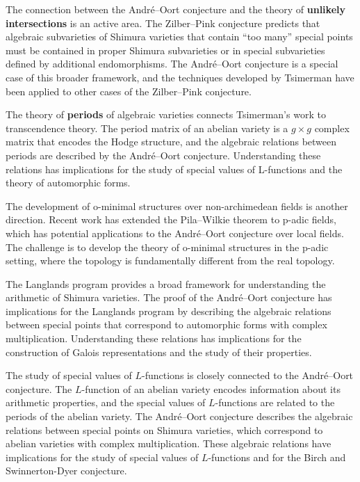 The connection between the Andr\'{e}--Oort conjecture and the theory of \textbf{unlikely intersections} is an active area. The Zilber--Pink conjecture predicts that algebraic subvarieties of Shimura varieties that contain ``too many'' special points must be contained in proper Shimura subvarieties or in special subvarieties defined by additional endomorphisms. The Andr\'{e}--Oort conjecture is a special case of this broader framework, and the techniques developed by Tsimerman have been applied to other cases of the Zilber--Pink conjecture.

The theory of \textbf{periods} of algebraic varieties connects Tsimerman's work to transcendence theory. The period matrix of an abelian variety is a $g \times g$ complex matrix that encodes the Hodge structure, and the algebraic relations between periods are described by the Andr\'{e}--Oort conjecture. Understanding these relations has implications for the study of special values of L-functions and the theory of automorphic forms.

The development of o-minimal structures over non-archimedean fields is another direction. Recent work has extended the Pila--Wilkie theorem to p-adic fields, which has potential applications to the Andr\'{e}--Oort conjecture over local fields. The challenge is to develop the theory of o-minimal structures in the p-adic setting, where the topology is fundamentally different from the real topology.

The Langlands program provides a broad framework for understanding the arithmetic of Shimura varieties. The proof of the Andr\'{e}--Oort conjecture has implications for the Langlands program by describing the algebraic relations between special points that correspond to automorphic forms with complex multiplication. Understanding these relations has implications for the construction of Galois representations and the study of their properties.

The study of special values of $L$-functions is closely connected to the Andr\'{e}--Oort conjecture. The $L$-function of an abelian variety encodes information about its arithmetic properties, and the special values of $L$-functions are related to the periods of the abelian variety. The Andr\'{e}--Oort conjecture describes the algebraic relations between special points on Shimura varieties, which correspond to abelian varieties with complex multiplication. These algebraic relations have implications for the study of special values of $L$-functions and for the Birch and Swinnerton-Dyer conjecture.

